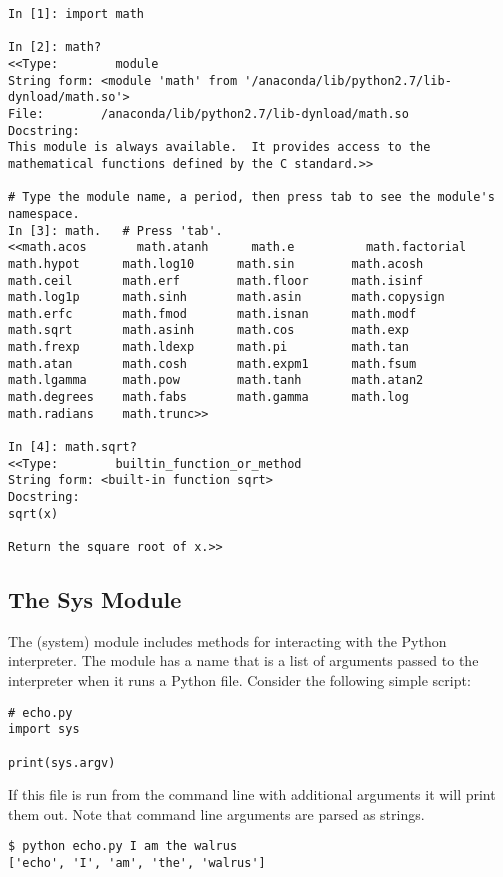 \begin{lstlisting}
In [1]: import math

In [2]: math?
<<Type:        module
String form: <module 'math' from '/anaconda/lib/python2.7/lib-dynload/math.so'>
File:        /anaconda/lib/python2.7/lib-dynload/math.so
Docstring:
This module is always available.  It provides access to the
mathematical functions defined by the C standard.>>

# Type the module name, a period, then press tab to see the module's namespace.
In [3]: math.   # Press 'tab'.
<<math.acos       math.atanh      math.e          math.factorial  
math.hypot      math.log10      math.sin        math.acosh      
math.ceil       math.erf        math.floor      math.isinf      
math.log1p      math.sinh       math.asin       math.copysign   
math.erfc       math.fmod       math.isnan      math.modf       
math.sqrt       math.asinh      math.cos        math.exp        
math.frexp      math.ldexp      math.pi         math.tan        
math.atan       math.cosh       math.expm1      math.fsum       
math.lgamma     math.pow        math.tanh       math.atan2      
math.degrees    math.fabs       math.gamma      math.log        
math.radians    math.trunc>>

In [4]: math.sqrt?
<<Type:        builtin_function_or_method
String form: <built-in function sqrt>
Docstring:
sqrt(x)

Return the square root of x.>>
\end{lstlisting}

\subsection*{The Sys Module} %

The  (system) module includes methods for interacting with the Python interpreter.
The module has a name  that is a list of arguments passed to the interpreter when it runs a Python file.
Consider the following simple script:

\begin{lstlisting}
# echo.py
import sys

print(sys.argv)
\end{lstlisting}

If this file is run from the command line with additional arguments it will print them out.
Note that command line arguments are parsed as strings.

\begin{lstlisting}
$ python echo.py I am the walrus
['echo', 'I', 'am', 'the', 'walrus']
\end{lstlisting}

